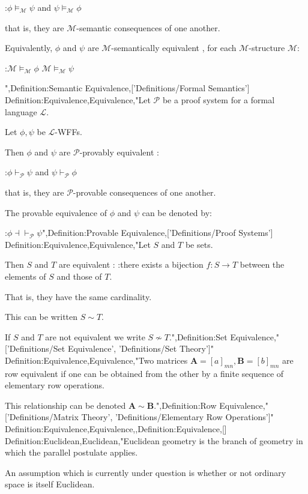:$\phi \models_{\mathscr M} \psi$ and $\psi \models_{\mathscr M} \phi$

that is,  they are $\mathscr M$-semantic consequences of one another.


Equivalently, $\phi$ and $\psi$ are $\mathscr M$-semantically equivalent , for each $\mathscr M$-structure $\mathcal M$:

:$\mathcal M \models_{\mathscr M} \phi$  $\mathcal M \models_{\mathscr M} \psi$




",Definition:Semantic Equivalence,['Definitions/Formal Semantics']
Definition:Equivalence,Equivalence,"Let $\mathscr P$ be a proof system for a formal language $\mathcal L$.

Let $\phi, \psi$ be $\mathcal L$-WFFs.


Then $\phi$ and $\psi$ are $\mathscr P$-provably equivalent :

:$\phi \vdash_{\mathscr P} \psi$ and $\psi \vdash_{\mathscr P} \phi$

that is,  they are $\mathscr P$-provable consequences of one another.


The provable equivalence of $\phi$ and $\psi$ can be denoted by:

:$\phi \dashv \vdash_{\mathscr P} \psi$",Definition:Provable Equivalence,['Definitions/Proof Systems']
Definition:Equivalence,Equivalence,"Let $S$ and $T$ be sets.

Then $S$ and $T$ are equivalent :
:there exists a bijection $f: S \to T$ between the elements of $S$ and those of $T$.

That is,  they have the same cardinality.


This can be written $S \sim T$.


If $S$ and $T$ are not equivalent we write $S \nsim T$.",Definition:Set Equivalence,"['Definitions/Set Equivalence', 'Definitions/Set Theory']"
Definition:Equivalence,Equivalence,"Two matrices $\mathbf A = \left[ a \right]_{m n}, \mathbf B = \left[ b \right]_{m n}$ are row equivalent if one can be obtained from the other by a finite sequence of elementary row operations.

This relationship can be denoted $\mathbf A \sim \mathbf B$.",Definition:Row Equivalence,"['Definitions/Matrix Theory', 'Definitions/Elementary Row Operations']"
Definition:Equivalence,Equivalence,,Definition:Equivalence,[]
Definition:Euclidean,Euclidean,"Euclidean geometry is the branch of geometry in which the parallel postulate applies.

An assumption which is currently under question is whether or not ordinary space is itself Euclidean.


